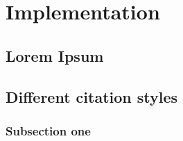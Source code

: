 \chapter{Implementation}

\section{Lorem Ipsum}

\lipsum[11-15]

\section{Different citation styles}

\subsection{Subsection one}

